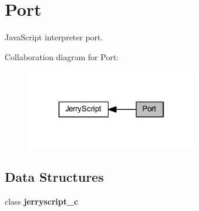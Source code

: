 \section{Port}
\label{group___port}


Java\+Script interpreter port.  


Collaboration diagram for Port\+:\nopagebreak
\begin{figure}[H]
\begin{center}
\leavevmode
\includegraphics[width=214pt]{group___port}
\end{center}
\end{figure}
\subsection*{Data Structures}
\begin{DoxyCompactItemize}
\item 
class \textbf{ jerryscript\+\_\+c}
\end{DoxyCompactItemize}
